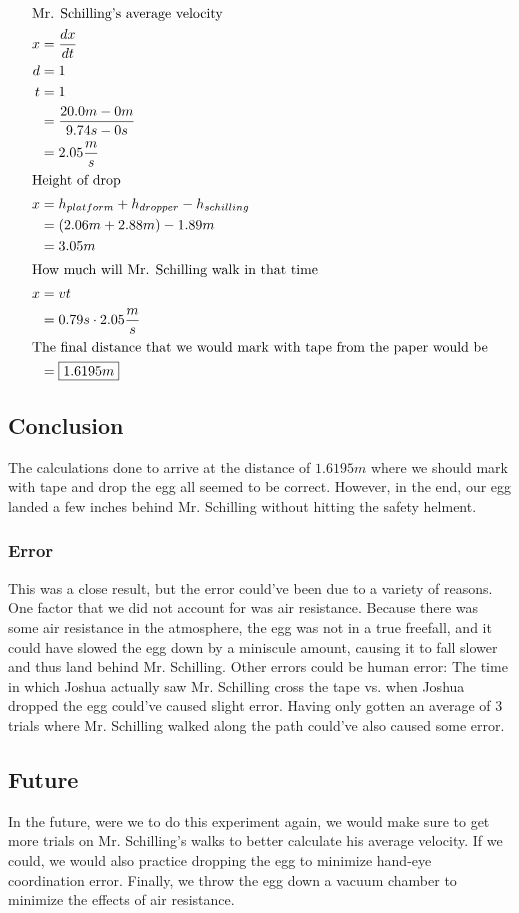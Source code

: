 \documentclass[12pt]{article}
\begin{document}
\begin{align*}
	\intertext{Mr. Schilling's average velocity}
	x & =\frac{dx}{dt}                          \\
	d & =1                                      \\
	t & =1                                      \\
	  & =\frac{20.0m-0m}{9.74s-0s}              \\
	  & =2.05\frac{m}{s}                        \\
	\intertext{Height of drop}
	x & =h_{platform}+h_{dropper}-h_{schilling} \\
	  & =\left(2.06m+2.88m\right)-1.89m         \\
	  & =3.05m                                  \\
	\intertext{How much will Mr. Schilling walk in that time}
	x & =vt                                     \\
	  & =0.79s\cdot2.05\frac{m}{s}              \\
	\intertext{The final distance that we would mark with tape from the paper would be}
	  & =\boxed{1.6195m}                        \\
\end{align*}

\subsection{Conclusion}

The calculations done to arrive at the distance of \(1.6195m\) where we should mark with tape and drop the egg all seemed to be correct. However, in the end, our egg landed a few inches behind Mr. Schilling without hitting the safety helment.

\subsubsection{Error}

This was a close result, but the error could've been due to a variety of reasons. One factor that we did not account for was air resistance. Because there was some air resistance in the atmosphere, the egg was not in a true freefall, and it could have slowed the egg down by a miniscule amount, causing it to fall slower and thus land behind Mr. Schilling. Other errors could be human error: The time in which Joshua actually saw Mr. Schilling cross the tape vs. when Joshua dropped the egg could've caused slight error. Having only gotten an average of 3 trials where Mr. Schilling walked along the path could've also caused some error.

\subsection{Future}

In the future, were we to do this experiment again, we would make sure to get more trials on Mr. Schilling's walks to better calculate his average velocity. If we could, we would also practice dropping the egg to minimize hand-eye coordination error. Finally, we throw the egg down a vacuum chamber to minimize the effects of air resistance.
\end{document}
